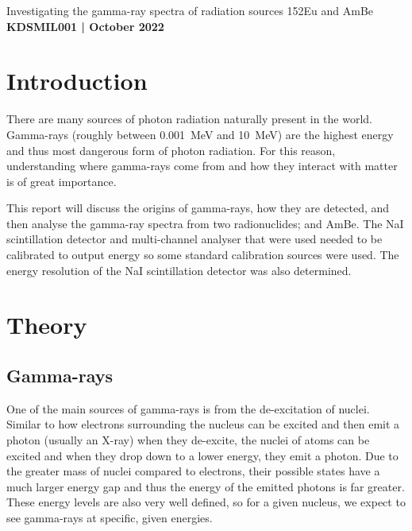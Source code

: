 \documentclass[11pt]{article}
\numberwithin{equation}{section}
\numberwithin{figure}{section}
\numberwithin{table}{section}
\begin{document}
\begin{center}
    {\huge Investigating the gamma-ray spectra of radiation sources 152Eu and AmBe}\\
    \vspace{0.2in}
    \textbf{KDSMIL001 | October 2022}
\end{center}


\section{Introduction}\label{sec:Introduction}
There are many sources of photon radiation naturally present in the world. Gamma-rays (roughly between \SI{0.001}{\mega\electronvolt} and \SI{10}{\mega\electronvolt}) are the highest energy and thus most dangerous form of photon radiation. For this reason, understanding where gamma-rays come from and how they interact with matter is of great importance. 

This report will discuss the origins of gamma-rays, how they are detected, and then analyse the gamma-ray spectra from two radionuclides;  and AmBe. The NaI scintillation detector and multi-channel analyser that were used needed to be calibrated to output energy so some standard calibration sources were used. The energy resolution of the NaI scintillation detector was also determined.

\section{Theory}\label{sec:Theory}

\subsection{Gamma-rays}\label{sec:GammaTheory}
One of the main sources of gamma-rays is from the de-excitation of nuclei. Similar to how electrons surrounding the nucleus can be excited and then emit a photon (usually an X-ray) when they de-excite, the nuclei of atoms can be excited and when they drop down to a lower energy, they emit a photon. Due to the greater mass of nuclei compared to electrons, their possible states have a much larger energy gap and thus the energy of the emitted photons is far greater. These energy levels are also very well defined, so for a given nucleus, we expect to see gamma-rays at specific, given energies. 
\end{document}

